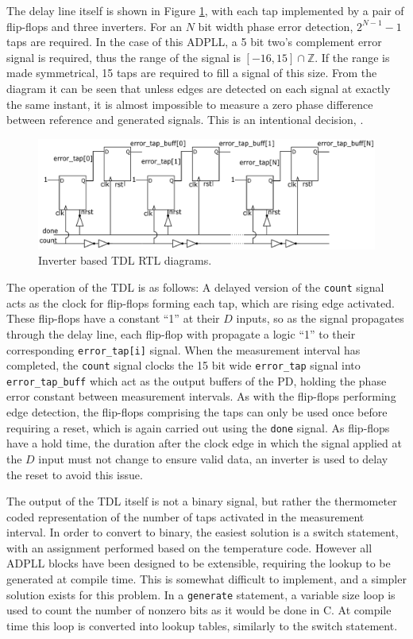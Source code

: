 The delay line itself is shown in Figure \ref{fig:tdl_impl}, with each tap implemented by a pair of flip-flops and three inverters. For an $N$ bit width phase error detection, $2^{N-1}-1$ taps are required. In the case of this \ac{ADPLL}, a 5 bit two's complement error signal is required, thus the range of the signal is $[-16,15]\cap\mathbb{Z}$. If the range is made symmetrical, 15 taps are required to fill a signal of this size. From the diagram it can be seen that unless edges are detected on each signal at exactly the same instant, it is almost impossible to measure a zero phase difference between reference and generated signals. This is an intentional decision, \cite{idkwhattocite}.
\begin{figure}[h]
	\centering
	\includegraphics[width=1.0\textwidth]{../new_pdet2}
	\caption[Inverter based \ac{TDL} RTL diagrams]{Inverter based \ac{TDL} RTL diagrams.}
	\label{fig:tdl_impl}
\end{figure}
The operation of the \ac{TDL} is as follows: A delayed version of the \texttt{count} signal acts as the clock for flip-flops forming each tap, which are rising edge activated. These flip-flops have a constant ``1'' at their $D$ inputs, so as the signal propagates through the delay line, each flip-flop with propagate a logic ``1'' to their corresponding \texttt{error\_tap[i]} signal. When the measurement interval has completed, the \texttt{count} signal clocks the 15 bit wide \texttt{error\_tap} signal into \texttt{error\_tap\_buff} which act as the output buffers of the \ac{PD}, holding the phase error constant between measurement intervals. As with the flip-flops performing edge detection, the flip-flops comprising the taps can only be used once before requiring a reset, which is again carried out using the \texttt{done} signal. As flip-flops have a hold time, the duration after the clock edge in which the signal applied at the $D$ input must not change to ensure valid data, an inverter is used to delay the reset to avoid this issue.

The output of the \ac{TDL} itself is not a binary signal, but rather the thermometer coded representation of the number of taps activated in the measurement interval. In order to convert to binary, the easiest solution is a switch statement, with an assignment performed based on the temperature code. However all \ac{ADPLL} blocks have been designed to be extensible, requiring the lookup to be generated at compile time. This is somewhat difficult to implement, and a simpler solution exists for this problem. In a \texttt{generate} statement, a variable size loop is used to count the number of nonzero bits as it would be done in C. At compile time this loop is converted into lookup tables, similarly to the switch statement.

